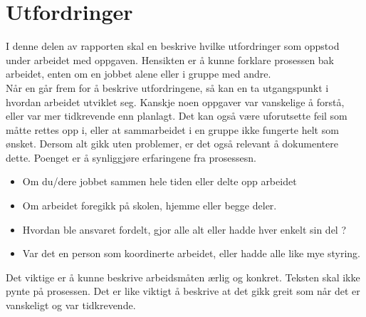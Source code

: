 \documentclass[../main-no.tex]{subfiles}
\begin{document}
\renewcommand{\baselinestretch}{1.5}
    \section{Utfordringer}
    I denne delen av rapporten skal en beskrive hvilke utfordringer som oppstod under arbeidet med oppgaven. Hensikten er å kunne forklare prosessen bak arbeidet, enten om en jobbet alene eller i gruppe med andre. \\

    Når en går frem for å beskrive utfordringene, så kan en ta utgangspunkt i hvordan arbeidet utviklet seg. Kanskje noen oppgaver var vanskelige å forstå, eller var mer tidkrevende enn planlagt. Det kan også være uforutsette feil som måtte rettes opp i, eller at sammarbeidet i en gruppe ikke fungerte helt som ønsket. Dersom alt gikk uten problemer, er det også relevant å dokumentere dette. Poenget er å synliggjøre erfaringene fra prosessesn. \\

    \begin{itemize}
        \item Om du/dere jobbet sammen hele tiden eller delte opp arbeidet
        \item Om arbeidet foregikk på skolen, hjemme eller begge deler.
        \item Hvordan ble ansvaret fordelt, gjor alle alt eller hadde hver enkelt sin del ?
        \item Var det en person som koordinerte arbeidet, eller hadde alle like mye styring.
    \end{itemize}

    Det viktige er å kunne beskrive arbeidsmåten ærlig og konkret. Teksten skal ikke pynte på prosessen. Det er like viktigt å beskrive at det gikk greit som når det er vanskeligt og var tidkrevende.
    
\clearpage
\end{document}
